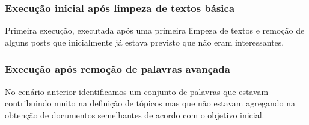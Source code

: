 \subsubsection{Execução inicial após limpeza de textos básica}

Primeira execução, executada após uma primeira limpeza de textos e remoção de alguns posts que inicialmente já estava previsto que não eram interessantes.



\subsubsection{Execução após remoção de palavras avançada}

No cenário anterior identificamos um conjunto de palavras que estavam contribuindo muito na definição de tópicos mas que não estavam agregando na obtenção
de documentos semelhantes de acordo com o objetivo inicial.